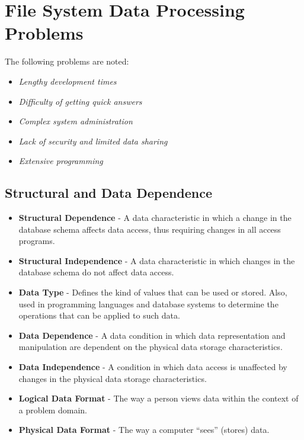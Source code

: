 \documentclass[a4paper, 12pt, titlepage]{report}
\begin{document}
\section{File System Data Processing Problems}
The following problems are noted:
\begin{itemize}
\item \emph{Lengthy development times}
\item \emph{Difficulty of getting quick answers}
\item \emph{Complex system administration}
\item \emph{Lack of security and limited data sharing}
\item \emph{Extensive programming}
\end{itemize}
\subsection{Structural and Data Dependence}
\begin{itemize}
\item \textbf{Structural Dependence} - A data characteristic in which a change in the database schema affects data access, thus requiring changes in all access programs. 
\item \textbf{Structural Independence} - A data characteristic in which changes in the database schema do not affect data access.
\item \textbf{Data Type} - Defines the kind of values that can be used or stored. Also, used in programming languages and database systems to determine the operations that can be applied to such data.
\item \textbf{Data Dependence} - A data condition in which data representation and manipulation are dependent on the physical data storage characteristics.
\item \textbf{Data Independence} - A condition in which data access is unaffected by changes in the physical data storage characteristics. 
\item \textbf{Logical Data Format} - The way a person views data within the context of a problem domain.
\item \textbf{Physical Data Format} - The way a computer “sees” (stores) data.
\end{itemize}
\end{document}
